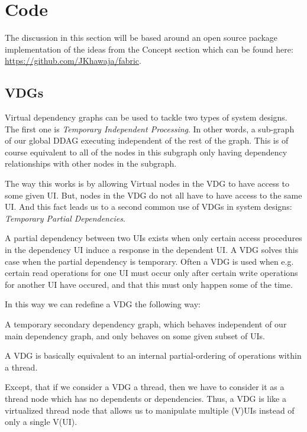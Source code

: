 \section{Code}

The discussion in this section will be based around an open source package implementation of the ideas from the Concept section which can be found here: \url{https://github.com/JKhawaja/fabric}.

\subsection{VDGs}

Virtual dependency graphs can be used to tackle two types of system designs. The first one is \textit{Temporary Independent Processing}. In other words, a sub-graph of our global DDAG executing independent of the rest of the graph. This is of course equivalent to all of the nodes in this subgraph only having dependency relationships with other nodes in the subgraph.

The way this works is by allowing Virtual nodes in the VDG to have access to some given UI. But, nodes in the VDG do not all have to have access to the same UI. And this fact leads us to a second common use of VDGs in system designs: \textit{Temporary Partial Dependencies}.

A partial dependency between two UIs exists when only certain access procedures in the dependency UI induce a response in the dependent UI. A VDG solves this case when the partial dependency is temporary. Often a VDG is used when e.g. certain read operations for one UI must occur only after certain write operations for another UI have occured, and that this must only happen some of the time.

In this way we can redefine a VDG the following way:

\begin{con-def}
	\label{vdg-code}
 	A temporary secondary dependency graph, which behaves independent of our main dependency graph, and only behaves on some given subset of UIs.
\end{con-def}

A VDG is basically equivalent to an internal partial-ordering of operations within a thread.

Except, that if we consider a VDG a thread, then we have to consider it as a thread node which has no dependents or dependencies. Thus, a VDG is like a virtualized thread node that allows us to manipulate multiple (V)UIs instead of only a single V(UI).

